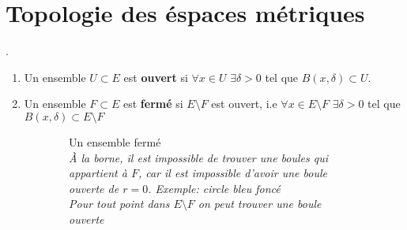 \section{Topologie des éspaces métriques}
\begin{definition}
    .
    \begin{enumerate}
        \item Un ensemble $U \subset  E$ est \textbf{ouvert} si $\forall x \in U$ $\exists \delta > 0$ tel que $B(x, \delta) \subset U$.
        \item Un ensemble $F \subset E$ est \textbf{fermé} si $E \setminus F$ est ouvert, i.e $\forall x \in E \setminus F$ $\exists \delta > 0$ tel que $B(x, \delta) \subset E\setminus F$
    \end{enumerate}
\end{definition}
\begin{figure}[H]
    \centering
    \begin{subfigure}{0.45\textwidth}
        \centering 
        \caption{Un ensemble fermé\\
            \textit{À la borne, il est impossible de trouver une boules qui appartient à $F$, car il est impossible d'avoir une boule ouverte de  $r = 0$. Exemple: circle bleu foncé}\\
            \textit{Pour tout point dans $E \setminus F$ on peut trouver une boule ouverte}
        }
    \end{subfigure}
    \hfill
    \begin{subfigure}{0.45\textwidth}
        \centering
\end{subfigure}
\end{figure}
